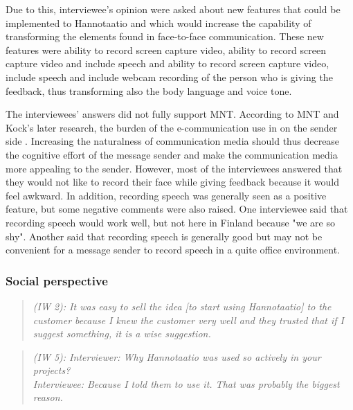 \documentclass[english,12pt,a4paper,pdftex]{article}
\newcommand{\q}[2]{
\begin{quote}
\emph{(IW #1): #2}
\end{quote}}
\begin{document}
Due to this, interviewee's opinion were asked about new features that could be implemented to Hannotaatio and which would increase the capability of transforming the elements found in face-to-face communication. These new features were ability to record screen capture video, ability to record screen capture video and include speech and ability to record screen capture video, include speech and include webcam recording of the person who is giving the feedback, thus transforming also the body language and voice tone.

The interviewees' answers did not fully support \ac{MNT}. According to \ac{MNT} and Kock's later research, the burden of the e-communication use in on the sender side \citep{kock2007}. Increasing the naturalness of communication media should thus decrease the cognitive effort of the message sender and make the communication media more appealing to the sender. However, most of the interviewees answered that they would not like to record their face while giving feedback because it would feel awkward. In addition, recording speech was generally seen as a positive feature, but some negative comments were also raised. One interviewee said that recording speech would work well, but not here in Finland because "we are so shy". Another said that recording speech is generally good but may not be convenient for a message sender to record speech in a quite office environment.

\subsubsection{Social perspective}

\q{2}{It was easy to sell the idea [to start using Hannotaatio] to the customer because I knew the customer very well and they trusted that if I suggest something, it is a wise suggestion.}

\q{5}{Interviewer: Why Hannotaatio was used so actively in your projects? \\ Interviewee: Because I told them to use it. That was probably the biggest reason.}
\end{document}
